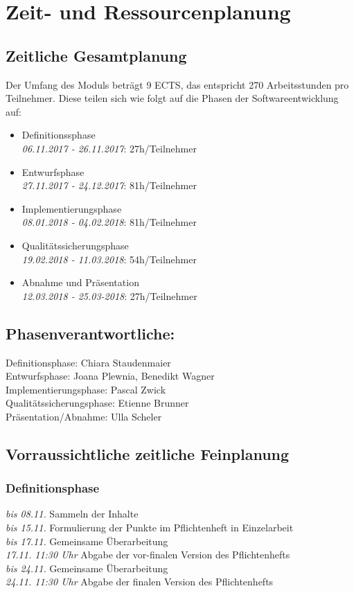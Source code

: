 \documentclass[parskip=full]{scrartcl}
\begin{document}
        
\section{Zeit- und Ressourcenplanung}
\subsection{Zeitliche Gesamtplanung}
Der Umfang des Moduls beträgt 9 ECTS, das entspricht 270 Arbeitsstunden pro Teilnehmer. Diese teilen sich wie folgt auf die Phasen der Softwareentwicklung auf: \\
\begin{itemize}
\item Definitionssphase\\ \textit{06.11.2017 - 26.11.2017}: 27h/Teilnehmer 
\item Entwurfsphase\\ \textit{27.11.2017 - 24.12.2017}: 81h/Teilnehmer
\item Implementierungsphase\\ \textit{08.01.2018 - 04.02.2018}:  81h/Teilnehmer
\item Qualitätssicherungsphase\\ \textit{19.02.2018 - 11.03.2018}: 54h/Teilnehmer
\item Abnahme und Präsentation\\ \textit{12.03.2018 - 25.03-2018}:  27h/Teilnehmer
\end{itemize}

\subsection{Phasenverantwortliche:}
Definitionsphase: Chiara Staudenmaier\\
Entwurfsphase: Joana Plewnia, Benedikt Wagner\\
Implementierungsphase: Pascal Zwick\\
Qualitätssicherungsphase: Etienne Brunner\\
Präsentation/Abnahme: Ulla Scheler\\
\subsection{Vorraussichtliche zeitliche Feinplanung}
\subsubsection{Definitionsphase}
\textit{bis 08.11.} Sammeln der Inhalte\\
\textit{bis 15.11.} Formulierung der Punkte im Pflichtenheft in Einzelarbeit\\
\textit{bis 17.11.} Gemeinsame Überarbeitung\\
\textit{17.11. 11:30 Uhr} Abgabe der vor-finalen Version des Pflichtenhefts\\
\textit{bis 24.11.} Gemeinsame Überarbeitung\\
\textit{24.11. 11:30 Uhr} Abgabe der finalen Version des Pflichtenhefts \\
\end{document}
